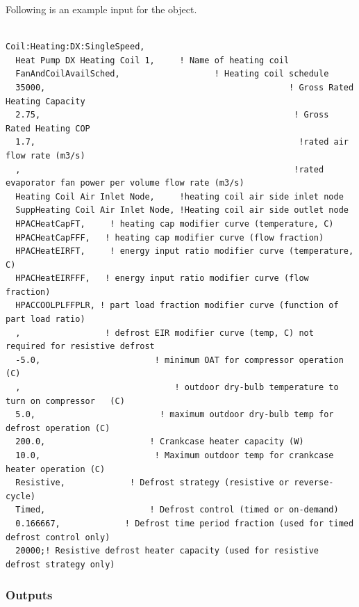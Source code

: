 Following is an example input for the object.

\begin{lstlisting}

Coil:Heating:DX:SingleSpeed,
  Heat Pump DX Heating Coil 1,     ! Name of heating coil
  FanAndCoilAvailSched,                   ! Heating coil schedule
  35000,                                                 ! Gross Rated Heating Capacity
  2.75,                                                   ! Gross Rated Heating COP
  1.7,                                                     !rated air flow rate (m3/s)
  ,                                                       !rated evaporator fan power per volume flow rate (m3/s)
  Heating Coil Air Inlet Node,     !heating coil air side inlet node
  SuppHeating Coil Air Inlet Node, !Heating coil air side outlet node
  HPACHeatCapFT,     ! heating cap modifier curve (temperature, C)
  HPACHeatCapFFF,   ! heating cap modifier curve (flow fraction)
  HPACHeatEIRFT,     ! energy input ratio modifier curve (temperature, C)
  HPACHeatEIRFFF,   ! energy input ratio modifier curve (flow fraction)
  HPACCOOLPLFFPLR, ! part load fraction modifier curve (function of part load ratio)
  ,                 ! defrost EIR modifier curve (temp, C) not required for resistive defrost
  -5.0,                       ! minimum OAT for compressor operation   (C)
  ,                               ! outdoor dry-bulb temperature to turn on compressor   (C)
  5.0,                         ! maximum outdoor dry-bulb temp for defrost operation (C)
  200.0,                     ! Crankcase heater capacity (W)
  10.0,                       ! Maximum outdoor temp for crankcase heater operation (C)
  Resistive,             ! Defrost strategy (resistive or reverse-cycle)
  Timed,                     ! Defrost control (timed or on-demand)
  0.166667,             ! Defrost time period fraction (used for timed defrost control only)
  20000;! Resistive defrost heater capacity (used for resistive defrost strategy only)
\end{lstlisting}

\subsubsection{Outputs}\label{outputs-15-000}

